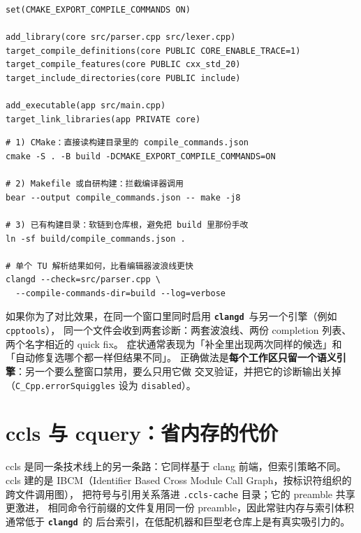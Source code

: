 \documentclass[12pt,a4paper,fontset=fandol]{ctexbook}
\newcommand{\Lib}[1]{\textbf{\texttt{#1}}}
\newcommand{\CD}{\Lib{clangd}}
\begin{document}
\begin{lstlisting}[style=cmakestyle,caption={让 CMake 自己产出编译数据库：clangd 最省事的接法},label={lst:ch06-cmake}]
set(CMAKE_EXPORT_COMPILE_COMMANDS ON)

add_library(core src/parser.cpp src/lexer.cpp)
target_compile_definitions(core PUBLIC CORE_ENABLE_TRACE=1)
target_compile_features(core PUBLIC cxx_std_20)
target_include_directories(core PUBLIC include)

add_executable(app src/main.cpp)
target_link_libraries(app PRIVATE core)
\end{lstlisting}

\begin{lstlisting}[style=shellstyle,caption={三种拿到编译数据库的方式，以及单 TU 自检},label={lst:ch06-compdb}]
# 1) CMake：直接读构建目录里的 compile_commands.json
cmake -S . -B build -DCMAKE_EXPORT_COMPILE_COMMANDS=ON

# 2) Makefile 或自研构建：拦截编译器调用
bear --output compile_commands.json -- make -j8

# 3) 已有构建目录：软链到仓库根，避免把 build 里那份手改
ln -sf build/compile_commands.json .

# 单个 TU 解析结果如何，比看编辑器波浪线更快
clangd --check=src/parser.cpp \
  --compile-commands-dir=build --log=verbose
\end{lstlisting}

\begin{warning}[title={把同一份编译数据库同时喂给多个引擎}]
如果你为了对比效果，在同一个窗口里同时启用 \CD\ 与另一个引擎（例如 \texttt{cpptools}），
同一个文件会收到两套诊断：两套波浪线、两份 completion 列表、两个名字相近的 quick fix。
症状通常表现为「补全里出现两次同样的候选」和「自动修复选哪个都一样但结果不同」。
正确做法是\textbf{每个工作区只留一个语义引擎}：另一个要么整窗口禁用，要么只用它做
交叉验证，并把它的诊断输出关掉（\texttt{C\_Cpp.errorSquiggles} 设为 \texttt{disabled}）。
\end{warning}

\section{ccls 与 cquery：省内存的代价}\label{sec:ch06-s2}

ccls 是同一条技术线上的另一条路：它同样基于 clang 前端，但索引策略不同。ccls 建的是
IBCM（Identifier Based Cross Module Call Graph，按标识符组织的跨文件调用图），
把符号与引用关系落进 \texttt{.ccls-cache} 目录；它的 preamble 共享更激进，
相同命令行前缀的文件复用同一份 preamble，因此常驻内存与索引体积通常低于 \CD\ 的
后台索引，在低配机器和巨型老仓库上是有真实吸引力的。
\end{document}

